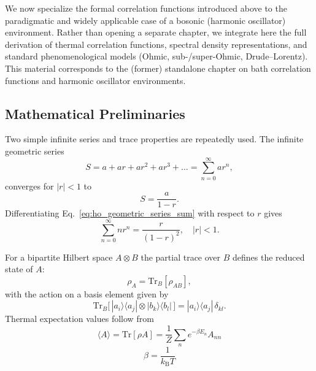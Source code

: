 We now specialize the formal correlation functions introduced above to the paradigmatic and widely applicable case of a bosonic (harmonic oscillator) environment. Rather than opening a separate chapter, we integrate here the full derivation of thermal correlation functions, spectral density representations, and standard phenomenological models (Ohmic, sub-/super-Ohmic, Drude--Lorentz). This material corresponds to the (former) standalone chapter on bath correlation functions and harmonic oscillator environments.

\subsection{Mathematical Preliminaries}
\label{subsec:preliminaries_tools}
Two simple infinite series and trace properties are repeatedly used. The infinite geometric series
\begin{equation} \label{eq:ho_infinite_geometric_series}
	S = a + ar + ar^2 + ar^3 + \dots = \sum_{n=0}^{\infty} ar^n,
\end{equation}
converges for $|r|<1$ to
\begin{equation} \label{eq:ho_geometric_series_sum}
	S = \frac{a}{1-r}.
\end{equation}
Differentiating Eq.~\eqref{eq:ho_geometric_series_sum} with respect to $r$ gives
\begin{equation} \label{eq:ho_derivation_geometric_sum}
	\sum_{n=0}^{\infty} n r^n = \frac{r}{(1-r)^2}, \quad |r|<1.
\end{equation}

For a bipartite Hilbert space $A\otimes B$ the partial trace over $B$ defines the reduced state of $A$:
\begin{equation} \label{eq:ho_partial_trace}
	\rho_A = \mathrm{Tr}_B[\rho_{AB}],
\end{equation}
with the action on a basis element given by
\begin{equation} \label{eq:ho_partial_trace_definition}
	\mathrm{Tr}_B\big[\,| a_i \rangle \langle a_j | \otimes | b_k \rangle \langle b_l |\,\big] = | a_i \rangle \langle a_j | \, \delta_{kl}.
\end{equation}
Thermal expectation values follow from
\begin{equation} \label{eq:ho_expectation_value} \langle A \rangle = \mathrm{Tr}[\rho A] = \frac{1}{Z} \sum_n e^{-\beta E_n} A_{nn}
\end{equation}
\begin{equation} \label{eq:ho_beta_definition}
	\beta = \frac{1}{k_{\mathrm{B}} T}
\end{equation}
